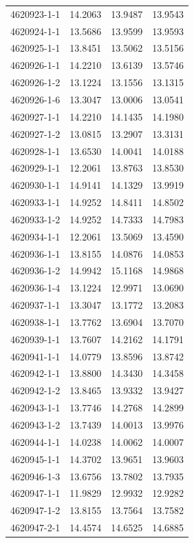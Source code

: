 \begin{longtable}{lrrr}
4620923-1-1 & 14.2063 & 13.9487 & 13.9543 \\
4620924-1-1 & 13.5686 & 13.9599 & 13.9593 \\
4620925-1-1 & 13.8451 & 13.5062 & 13.5156 \\
4620926-1-1 & 14.2210 & 13.6139 & 13.5746 \\
4620926-1-2 & 13.1224 & 13.1556 & 13.1315 \\
4620926-1-6 & 13.3047 & 13.0006 & 13.0541 \\
4620927-1-1 & 14.2210 & 14.1435 & 14.1980 \\
4620927-1-2 & 13.0815 & 13.2907 & 13.3131 \\
4620928-1-1 & 13.6530 & 14.0041 & 14.0188 \\
4620929-1-1 & 12.2061 & 13.8763 & 13.8530 \\
4620930-1-1 & 14.9141 & 14.1329 & 13.9919 \\
4620933-1-1 & 14.9252 & 14.8411 & 14.8502 \\
4620933-1-2 & 14.9252 & 14.7333 & 14.7983 \\
4620934-1-1 & 12.2061 & 13.5069 & 13.4590 \\
4620936-1-1 & 13.8155 & 14.0876 & 14.0853 \\
4620936-1-2 & 14.9942 & 15.1168 & 14.9868 \\
4620936-1-4 & 13.1224 & 12.9971 & 13.0690 \\
4620937-1-1 & 13.3047 & 13.1772 & 13.2083 \\
4620938-1-1 & 13.7762 & 13.6904 & 13.7070 \\
4620939-1-1 & 13.7607 & 14.2162 & 14.1791 \\
4620941-1-1 & 14.0779 & 13.8596 & 13.8742 \\
4620942-1-1 & 13.8800 & 14.3430 & 14.3458 \\
4620942-1-2 & 13.8465 & 13.9332 & 13.9427 \\
4620943-1-1 & 13.7746 & 14.2768 & 14.2899 \\
4620943-1-2 & 13.7439 & 14.0013 & 13.9976 \\
4620944-1-1 & 14.0238 & 14.0062 & 14.0007 \\
4620945-1-1 & 14.3702 & 13.9651 & 13.9603 \\
4620946-1-3 & 13.6756 & 13.7802 & 13.7935 \\
4620947-1-1 & 11.9829 & 12.9932 & 12.9282 \\
4620947-1-2 & 13.8155 & 13.7564 & 13.7582 \\
4620947-2-1 & 14.4574 & 14.6525 & 14.6885 \\

\end{longtable}
